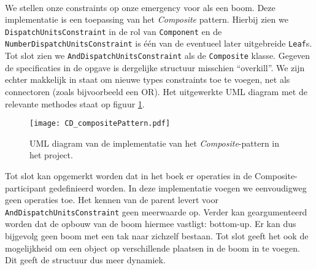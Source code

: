 \paragraph{}
We stellen onze constraints op onze emergency voor als een boom. Deze implementatie is een toepassing van het \textit{Composite} pattern. Hierbij zien we \texttt{Dispatch\-Units\-Constraint} in de rol van \texttt{Component} en de \texttt{Number\-Dispatch\-Units\-Constraint} is \'e\'en van de eventueel later uitgebreide \texttt{Leaf}s. Tot slot zien we \texttt{And\-Dispatch\-Units\-Constraint} als de \texttt{Composite} klasse. Gegeven de specificaties in de opgave is dergelijke structuur misschien ``overkill''. We zijn echter makkelijk in staat om nieuwe types constraints toe te voegen, net als connectoren (zoals bijvoorbeeld een OR). Het uitgewerkte UML diagram met de relevante methodes staat op figuur \ref{fig:compositePattern}.
\begin{figure}[h!]
\texttt{[image: CD\_compositePattern.pdf]}
\caption{UML diagram van de implementatie van het \textit{Composite}-pattern in het project.}
\label{fig:compositePattern}
\end{figure}
Tot slot kan opgemerkt worden dat in het boek er operaties in de Composite-participant gedefinieerd worden. In deze implementatie voegen we eenvoudigweg geen operaties toe. Het kennen van de parent levert voor \verb+AndDispatchUnitsConstraint+ geen meerwaarde op. Verder kan geargumenteerd worden dat de opbouw van de boom hiermee vastligt: bottom-up. Er kan dus bijgevolg geen boom met een tak naar zichzelf bestaan. Tot slot geeft het ook de mogelijkheid om een object op verschillende plaatsen in de boom in te voegen. Dit geeft de structuur dus meer dynamiek.
